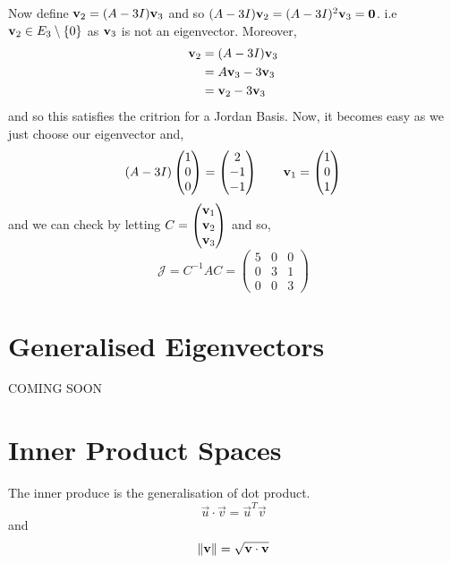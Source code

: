\documentclass{article}
\begin{document}
\begin{eg}
  {\color{blue}
    \noindent{}
  }

  \noindent
  Now define $\boldsymbol{\mathbf{v}}_2 = (A - 3I)\boldsymbol{\mathbf{v}}_3$ and so $(A - 3I)\boldsymbol{\mathbf{v}}_2 = (A - 3I)^2\boldsymbol{\mathbf{v}}_3 = \boldsymbol{\mathbf{0}}$. i.e $\boldsymbol{\mathbf{v}}_2 \in E_3\setminus \{0\}$ as $\boldsymbol{\mathbf{v}}_3$ is not an eigenvector. Moreover,
  \begin{align*}
    \boldsymbol{\mathbf{v}}_2 &= (A - 3I)\boldsymbol{\mathbf{v}}_3\\
    &= A\boldsymbol{\mathbf{v}}_3 - 3\boldsymbol{\mathbf{v}}_3\\
    &= \boldsymbol{\mathbf{v}}_2 - 3\boldsymbol{\mathbf{v}}_3
  \end{align*}
  and so this satisfies the critrion for a Jordan Basis. Now, it becomes easy as we just choose our eigenvector and,
  $$ (A - 3I)\begin{pmatrix}
1 \\ 0 \\ 0
\end{pmatrix} = \begin{pmatrix}
    2 \\ -1\\-1
  \end{pmatrix} \qquad \boldsymbol{\mathbf{v}}_1 = \begin{pmatrix}
    1\\0\\1
  \end{pmatrix} $$
  and we can check by letting $\displaystyle{C = \begin{pmatrix}
    \boldsymbol{\mathbf{v}}_1\\\boldsymbol{\mathbf{v}}_2\\\boldsymbol{\mathbf{v}}_3
  \end{pmatrix}}$ and so,
  $$ \mathcal{J} = C^{-1}AC = \begin{pmatrix}
    5 &0&0\\0&3&1\\0&0&3
  \end{pmatrix} $$

\end{eg}

\section{Generalised Eigenvectors}

COMING SOON

\section{Inner Product Spaces}
The inner produce is the generalisation of dot product.
$$ \vec u \cdot \vec v = \vec u^T \vec v $$
and
$$ \left\lVert \boldsymbol{\mathbf{v}}\right\rVert = \sqrt{\boldsymbol{\mathbf{v}} \cdot \boldsymbol{\mathbf{v}}} $$
\end{document}
